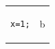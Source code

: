 \documentclass{article}\usepackage{listings}
\begin{document}
\begin{tabular}{p{3cm}l}
\begin{minipage}{2cm}\begin{lstlisting}
x=1;
\end{lstlisting}\end{minipage} & b \\
\end{tabular}
\end{document}
